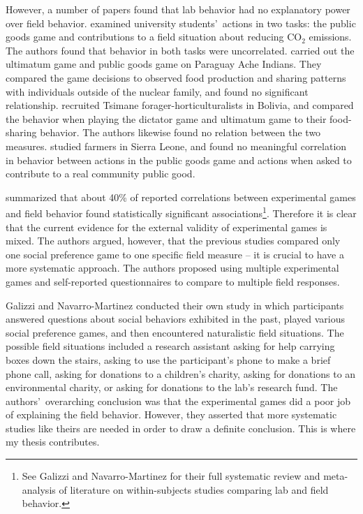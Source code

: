 \documentclass[12pt]{article}
\begin{document}
However, a number of papers found that lab behavior had no explanatory power over field behavior. \cite{goeschl_2015} examined university students\rq \ actions in two tasks: the public goods game and contributions to a field situation about reducing CO$_{2}$ emissions. The authors found that behavior in both tasks were uncorrelated. \cite{hill_gurven_2004} carried out the ultimatum game and public goods game on Paraguay Ache Indians. They compared the game decisions to observed food production and sharing patterns with individuals outside of the nuclear family, and found no significant relationship. \cite{gurven_winking_2008} recruited Tsimane forager-horticulturalists in Bolivia, and compared the behavior when playing the dictator game and ultimatum game to their food-sharing behavior. The authors likewise found no relation between the two measures. \cite{voors_2012} studied farmers in Sierra Leone, and found no meaningful correlation in behavior between actions in the public goods game and actions when asked to contribute to a real community public good.

\cite{galizzi_navarro-martinez_2017} summarized that about 40\% of reported correlations between experimental games and field behavior found statistically significant associations\footnote{See Galizzi and Navarro-Martinez for their full systematic review and meta-analysis of literature on within-subjects studies comparing lab and field behavior.}. Therefore it is clear that the current evidence for the external validity of experimental games is mixed. The authors argued, however, that the previous studies compared only one social preference game to one specific field measure -- it is crucial to have a more systematic approach. The authors proposed using multiple experimental games and self-reported questionnaires to compare to multiple field responses. 

Galizzi and Navarro-Martinez conducted their own study in which participants answered questions about social behaviors exhibited in the past, played various social preference games, and then encountered naturalistic field situations. The possible field situations included a research assistant asking for help carrying boxes down the stairs, asking to use the participant\rq s phone to make a brief phone call, asking for donations to a children\rq s charity, asking for donations to an environmental charity, or asking for donations to the lab\rq s research fund.  The authors\rq \ overarching conclusion was that the experimental games did a poor job of explaining the field behavior. However, they asserted that more systematic studies like theirs are needed in order to draw a definite conclusion. This is where my thesis contributes.
\end{document}

